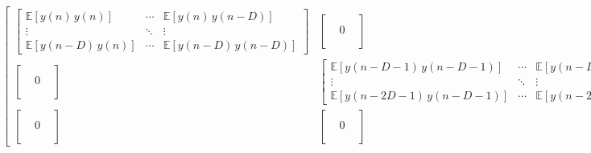 \documentclass[14pt]{extarticle}
\begin{document}
\begin{scriptsize}
\[
\begin{bmatrix}

\begin{bmatrix}
\mathbb{E}[y(n) \, y(n)] & \cdots & \mathbb{E}[y(n) \, y(n-D)] \\ 
\vdots & \ddots & \vdots \\
\mathbb{E}[y(n-D) \, y(n)] & \cdots & \mathbb{E}[y(n-D) \, y(n-D)]
\end{bmatrix} &
\begin{bmatrix}
{} & {} & {} \\
{} & 0 & {} \\
{} & {} & {} \\
\end{bmatrix} &
\begin{bmatrix}
{} & {} & {} \\
{} & 0 & {} \\
{} & {} & {} \\
\end{bmatrix} \\

\begin{bmatrix}
{} & {} & {} \\
{} & 0 & {} \\
{} & {} & {} \\
\end{bmatrix} &
\begin{bmatrix}
\mathbb{E}[y(n-D-1) \, y(n-D-1)] & \cdots & \mathbb{E}[y(n-D-1) \, y(n-2D-1)] \\ 
\vdots & \ddots & \vdots \\
\mathbb{E}[y(n-2D-1) \, y(n-D-1)] & \cdots & \mathbb{E}[y(n-2D-1) \, y(n-2D-1)]
\end{bmatrix} &
\begin{bmatrix}
{} & {} & {} \\
{} & 0 & {} \\
{} & {} & {} \\
\end{bmatrix} \\

\begin{bmatrix}
{} & {} & {} \\
{} & 0 & {} \\
{} & {} & {} \\
\end{bmatrix} &
\begin{bmatrix}
{} & {} & {} \\
{} & 0 & {} \\
{} & {} & {} \\
\end{bmatrix} &
\begin{bmatrix}
{} & {} & {} \\
{} & \ddots & {} \\
{} & {} & {}
\end{bmatrix}

\end{bmatrix}
\]
\end{scriptsize}
\end{document}
